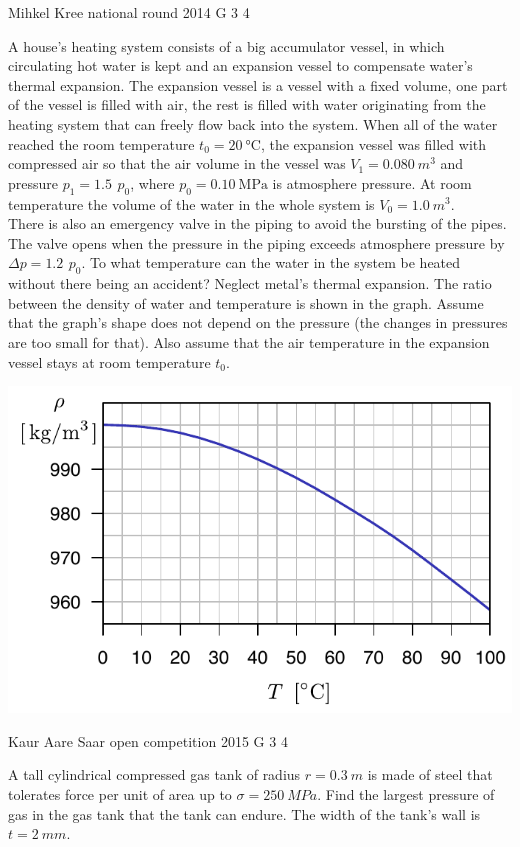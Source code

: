\documentclass[11pt]{article}
\begin{document}
{Mihkel Kree} %
{national round} %
{2014} %
{G 3} %
{4} %
{

\ifEngStatement
A house’s heating system consists of a big accumulator vessel, in which circulating hot water is kept and an expansion vessel to compensate water’s thermal expansion. The expansion vessel is a vessel with a fixed volume, one part of the vessel is filled with air, the rest is filled with water originating from the heating system that can freely flow back into the system. When all of the water reached the room temperature $t_0=\SI{20}{\celsius}$, the expansion vessel was filled with compressed air so that the air volume in the vessel was $V_1=\SI{0.080}{m^3}$ and pressure $p_1=\SI{1.5}{}\,p_0$, where $p_0=\SI{0.10}{\mega\pascal}$ is atmosphere pressure. At room temperature the volume of the water in the whole system is $V_0=\SI{1.0}{m^3}$.\\
There is also an emergency valve in the piping to avoid the bursting of the pipes. The valve opens when the pressure in the piping exceeds atmosphere pressure by $\Delta p = \SI{1.2}{} \, p_0 $. To what temperature can the water in the system be heated without there being an accident? Neglect metal’s thermal expansion. The ratio between the density of water and temperature is shown in the graph. Assume that the graph’s shape does not depend on the pressure (the changes in pressures are too small for that). Also assume that the air temperature in the expansion vessel stays at room temperature $t_0$.
\begin{center}
\includegraphics[width=0.8\linewidth]{2014-v3g-03-veeTihedus}
\end{center}
\fi
}

{Kaur Aare Saar} %
{open competition} %
{2015} %
{G 3} %
{4} %
{

\ifEngStatement
A tall cylindrical compressed gas tank of radius $r=\SI{0,3}{m}$ is made of steel that tolerates force per unit of area up to $\sigma=\SI{250}{MPa}$. Find the largest pressure of gas in the gas tank that the tank can endure. The width of the tank’s wall is $t=\SI{2}{mm}$.
\fi
}
\end{document}
